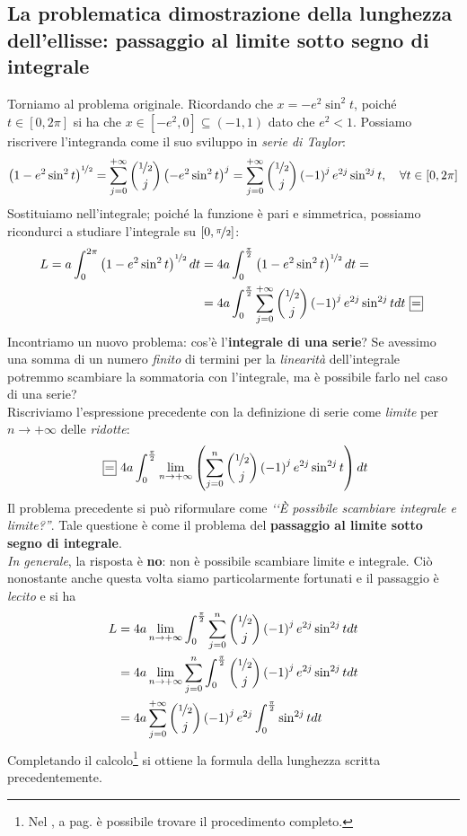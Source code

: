 \subsection{La problematica dimostrazione della lunghezza dell'ellisse: passaggio al limite sotto segno di integrale}
Torniamo al problema originale. Ricordando che $x=-e^2\sin^2 t$, poiché $t\in\left[0,2\pi\right]$ si ha che $x\in\left[-e^2, 0\right]\subseteq\left(-1, 1\right)$ dato che $e^2<1$. Possiamo riscrivere l'integranda come il suo sviluppo in \textit{serie di Taylor}:
\begin{align*}
	\left(1-e^2\sin^2t\right)^{\nicefrac{1}{2}}=\sum_{j=0}^{+\infty}\binom{\nicefrac{1}{2}}{j}\left(-e^2\sin^2t\right)^j=\sum_{j=0}^{+\infty}\binom{\nicefrac{1}{2}}{j}\left(-1\right)^je^{2j}\sin^{2j}t,\quad \forall t\in\left[0, 2\pi\right]
\end{align*}
Sostituiamo nell'integrale; poiché la funzione è pari e simmetrica, possiamo ricondurci a studiare l'integrale su $\left[0,\nicefrac{\pi}{2}\right]$:
\begin{align*}
L=a\int_{0}^{2\pi}\left(1-e^2\sin^2t\right)^{\nicefrac{1}{2}}dt&=4a\int_{0}^{\frac{\pi}{2}}\left(1-e^2\sin^2t\right)^{\nicefrac{1}{2}}dt=\\
&=4a\int_{0}^{\frac{\pi}{2}}\sum_{j=0}^{+\infty}\binom{\nicefrac{1}{2}}{j}\left(-1\right)^je^{2j}\sin^{2j}tdt\squarequal
\end{align*}
Incontriamo un nuovo problema: cos'è l'\textbf{integrale di una serie}? Se avessimo una somma di un numero \textit{finito} di termini per la \textit{linearità} dell'integrale potremmo scambiare la sommatoria con l'integrale, ma è possibile farlo nel caso di una serie?\\
Riscriviamo l'espressione precedente con la definizione di serie come \textit{limite} per $n\to +\infty$ delle \textit{ridotte}:
\begin{equation*}
	\squarequal 4a\int_{0}^{\frac{\pi}{2}}\lim_{n\to+\infty}\left(\sum_{j=0}^{n}\binom{\nicefrac{1}{2}}{j}\left(-1\right)^je^{2j}\sin^{2j}t\right)dt
\end{equation*}
Il problema precedente si può riformulare come \emph{‘‘È possibile scambiare integrale e limite?''}. Tale questione è come il problema del \textbf{passaggio al limite sotto segno di integrale}.\\
\textit{In generale}, la risposta è \textbf{no}: non è possibile scambiare limite e integrale. Ciò nonostante anche questa volta siamo particolarmente fortunati e il passaggio è \textit{lecito} e si ha
\begin{align*}
	L&=4a\lim_{n\to+\infty}\int_{0}^{\frac{\pi}{2}}\sum_{j=0}^{n}\binom{\nicefrac{1}{2}}{j}\left(-1\right)^je^{2j}\sin^{2j}tdt\\
	&=4a\lim_{n\to+\infty}\sum_{j=0}^{n}\int_{0}^{\frac{\pi}{2}}\binom{\nicefrac{1}{2}}{j}\left(-1\right)^je^{2j}\sin^{2j}tdt\\
	&=4a\sum_{j=0}^{+\infty}\binom{\nicefrac{1}{2}}{j}\left(-1\right)^je^{2j}\int_{0}^{\frac{\pi}{2}}\sin^{2j}tdt
\end{align*}
Completando il calcolo\footnote{Nel , a pag. \pageref{lunghezzaellisse} è possibile trovare il procedimento completo.} si ottiene la formula della lunghezza scritta precedentemente.\\
